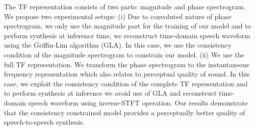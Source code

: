 The TF representation consists of two parts: magnitude and phase spectrogram. We propose two experimental setups: (i) Due to convoluted nature of phase spectrogram, we only use the magnitude part for the training of our model and to perform synthesis at inference time, we reconstruct time-domain speech waveform using the Griffin-Lim algorithm (GLA). In this case, we use the consistency condition of the magnitude spectrogram to constrain our model. (ii) We use the full TF representation. We transform the phase spectrogram to the instantaneous frequency representation which also relates to perceptual quality of sound. In this case, we exploit the consistency condition of the complete TF representation and to perform synthesis at inference we avoid use of GLA and reconstruct time-domain speech waveform using inverse-STFT operation. Our results demonstrate that the consistency constrained model provides a perceptually better quality of speech-to-speech synthesis.



  